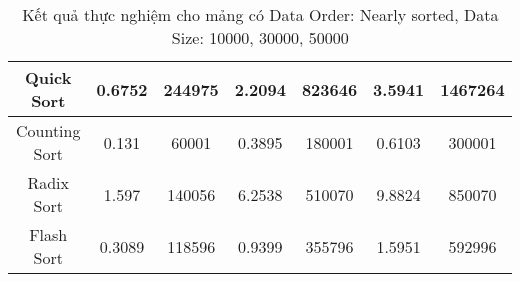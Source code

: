 \begin{table}[H]
{\begin{tabular}{|ccccccc|}
\multicolumn{1}{|c|}{Quick Sort} & \multicolumn{1}{c|}{0.6752} & \multicolumn{1}{c|}{244975} & \multicolumn{1}{c|}{2.2094} & \multicolumn{1}{c|}{823646} & \multicolumn{1}{c|}{3.5941} & \multicolumn{1}{c|}{1467264} \\ \hline
\multicolumn{1}{|c|}{Counting Sort} & \multicolumn{1}{c|}{0.131} & \multicolumn{1}{c|}{60001} & \multicolumn{1}{c|}{0.3895} & \multicolumn{1}{c|}{180001} & \multicolumn{1}{c|}{0.6103} & \multicolumn{1}{c|}{300001} \\ \hline
\multicolumn{1}{|c|}{Radix Sort} & \multicolumn{1}{c|}{1.597} & \multicolumn{1}{c|}{140056} & \multicolumn{1}{c|}{6.2538} & \multicolumn{1}{c|}{510070} & \multicolumn{1}{c|}{9.8824} & \multicolumn{1}{c|}{850070} \\ \hline
\multicolumn{1}{|c|}{Flash Sort} & \multicolumn{1}{c|}{0.3089} & \multicolumn{1}{c|}{118596} & \multicolumn{1}{c|}{0.9399} & \multicolumn{1}{c|}{355796} & \multicolumn{1}{c|}{1.5951} & \multicolumn{1}{c|}{592996} \\ \hline
\end{tabular}%
}
\caption{Kết quả thực nghiệm cho mảng có Data Order: Nearly sorted, Data Size: 10000, 30000, 50000}
\label{tab:nearly_sorted_10000_30000_50000}
\end{table}

